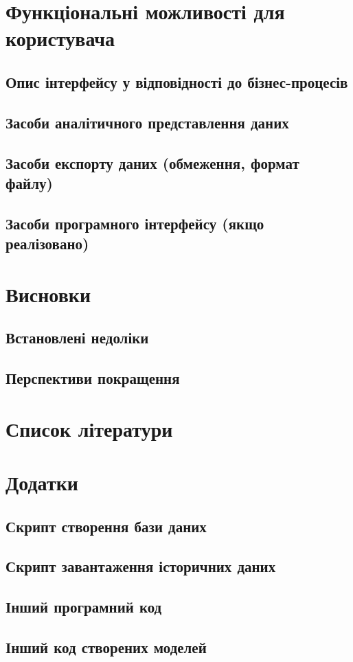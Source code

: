 \documentclass[oneside,14pt]{extarticle}
\begin{document}
\section{Функціональні можливості для користувача}
\subsection{Опис інтерфейсу у відповідності до бізнес-процесів}
\subsection{Засоби аналітичного представлення даних}
\subsection{Засоби експорту даних (обмеження, формат файлу)}
\subsection{Засоби програмного інтерфейсу (якщо реалізовано)}
\newpage

\section{Висновки}
\subsection{Встановлені недоліки}
\subsection{Перспективи покращення}
\newpage

\section{Список літератури}
\newpage

\section{Додатки}
\subsection{Скрипт створення бази даних}
\subsection{Скрипт завантаження історичних даних}
\subsection{Інший програмний код}
\subsection{Інший код створених моделей}
\newpage
\end{document}
